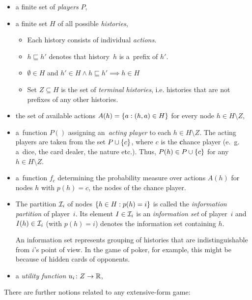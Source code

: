 \begin{itemize}
  \item a finite set of \emph{players} $P$,
  \item a finite set $H$ of all possible \emph{histories},
    \begin{itemize}
      \item Each history consists of individual \emph{actions}.
      \item $h \sqsubseteq h'$ denotes that history~$h$ is a~prefix of $h'$.
      \item $\emptyset \in H$ and $h' \in H \land h \sqsubseteq h' \implies h \in H$
      \item Set $Z \subseteq H$ is the set of \emph{terminal histories}, i.e. histories that are not prefixes of any other histories.
    \end{itemize}
  \item the set of available actions $A(h) = \left\{ a: (h, a) \in H \right\}$ for every node $h \in H \setminus Z$,
  \item a~function $P()$ assigning an~\emph{acting player} to each $h \in H \setminus Z$.
    The acting players are taken from the set $P \cup \left\{ c \right\}$, where $c$ is the \textbf{c}hance player (e.~g. a~dice, the card dealer, the nature etc.).
    Thus, $P(h) \in P \cup \left\{ c \right\}$ for any $h \in H \setminus Z$.
  \item a~function $f_c$ determining the probability measure over actions $A(h)$ for nodes $h$ with $p(h) = c$, the nodes of the chance player.
  \item The partition $\mathcal{I}_i$ of nodes $\left\{ h \in H: p(h) = i \right\}$ is called the \emph{information partition} of player~$i$.
    Its element $I \in \mathcal{I}_i$ is an \emph{information set} of player~$i$ and $I(h) \in \mathcal{I}_i$ (with $p(h) = i$) denotes the information set containing $h$.

    An information set represents grouping of histories that are indistinguishable from $i$'s point of view.
    In the game of poker, for example, this might be because of hidden cards of opponents.
  \item a \emph{utility function} $u_i\colon Z \rightarrow \mathbb{R}$,
\end{itemize}

There are further notions related to any extensive-form game:

